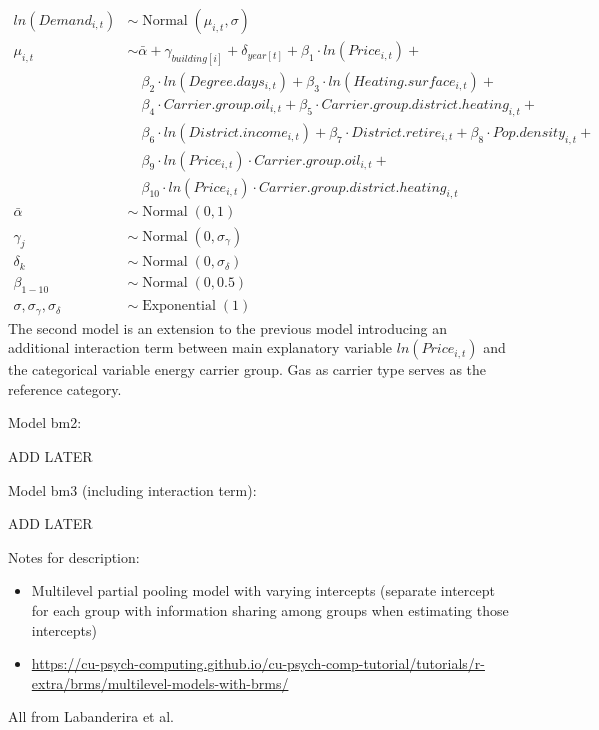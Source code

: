 \documentclass[12pt,twoside]{reedthesis}
\begin{document}
\begin{align*}
ln(Demand_{i,t}) & \sim \operatorname{Normal}(\mu_{i,t}, \sigma) \\
\mu_{i,t} & \sim \bar\alpha + \gamma_{building[i]} + \delta_{year[t]} + \beta_1 \cdot ln(Price_{i,t}) +  \\
 & \quad \beta_{2} \cdot ln(Degree.days_{i,t}) + \beta_{3} \cdot ln(Heating.surface_{i,t}) + \\
 & \quad \beta_{4} \cdot Carrier.group.oil_{i,t} + \beta_{5} \cdot Carrier.group.district.heating_{i,t} + \\
 & \quad \beta_{6} \cdot ln(District.income_{i,t}) + \beta_{7} \cdot District.retire_{i,t} + \beta_{8} \cdot Pop.density_{i,t} + \\
 & \quad \beta_{9} \cdot ln(Price_{i,t}) \cdot Carrier.group.oil_{i,t} + \\
 & \quad \beta_{10} \cdot ln(Price_{i,t}) \cdot Carrier.group.district.heating_{i,t} \\
\bar\alpha & \sim \operatorname{Normal}(0, 1) \\
\gamma_j & \sim \operatorname{Normal}(0, \sigma_{\gamma}) \\
\delta_k & \sim \operatorname{Normal}(0, \sigma_{\delta}) \\
\beta_{1-10} & \sim \operatorname{Normal}(0, 0.5) \\
\sigma, \sigma_{\gamma}, \sigma_{\delta} & \sim \operatorname{Exponential}(1)
\end{align*}
The second model is an extension to the previous model introducing an additional interaction term between main explanatory variable \(ln(Price_{i,t})\) and the categorical variable energy carrier group. Gas as carrier type serves as the reference category.

Model bm2:

ADD LATER

Model bm3 (including interaction term):

ADD LATER

Notes for description:
\begin{itemize}
\item
  Multilevel partial pooling model with varying intercepts (separate intercept for each group with information sharing among groups when estimating those intercepts)
\item
  \url{https://cu-psych-computing.github.io/cu-psych-comp-tutorial/tutorials/r-extra/brms/multilevel-models-with-brms/}
\end{itemize}
All from Labanderira et al.
\end{document}
